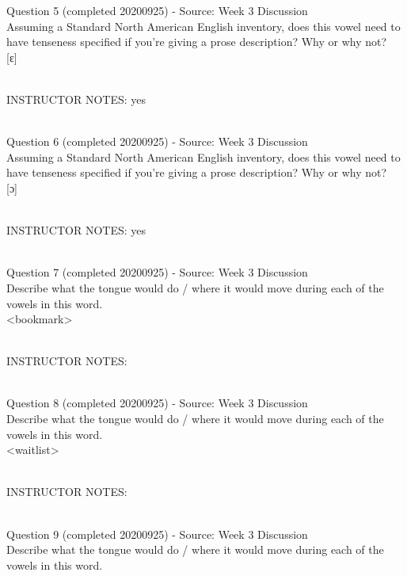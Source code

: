 \documentclass[12pt]{article}
\begin{document}
{\large Question 5} (completed 20200925) - Source: Week 3 Discussion\\

Assuming a Standard North American English inventory, does this vowel need to have tenseness specified if you're giving a prose description? Why or why not?\\

{[ɛ]}


~\\
INSTRUCTOR NOTES: yes


~\\

{\large Question 6} (completed 20200925) - Source: Week 3 Discussion\\

Assuming a Standard North American English inventory, does this vowel need to have tenseness specified if you're giving a prose description? Why or why not?\\

{[ɔ]}


~\\
INSTRUCTOR NOTES: yes


~\\

{\large Question 7} (completed 20200925) - Source: Week 3 Discussion\\

Describe what the tongue would do / where it would move during each of the vowels in this word.\\

<bookmark>


~\\
INSTRUCTOR NOTES: 


~\\

{\large Question 8} (completed 20200925) - Source: Week 3 Discussion\\

Describe what the tongue would do / where it would move during each of the vowels in this word.\\

<waitlist>


~\\
INSTRUCTOR NOTES: 


~\\

{\large Question 9} (completed 20200925) - Source: Week 3 Discussion\\

Describe what the tongue would do / where it would move during each of the vowels in this word.\\
\end{document}

